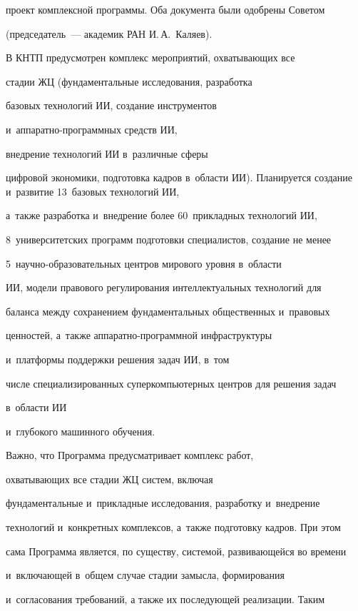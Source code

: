 проект комплексной программы. Оба документа были одобрены Советом 

(председатель~--- академик РАН И.\,А.~Каляев). 

    

     В КНТП предусмотрен комплекс мероприятий, охватывающих все 

стадии ЖЦ (фундаментальные исследования, разработка 

базовых технологий ИИ, создание инструментов 

и~ап\-па\-рат\-но-про\-грам\-мных средств ИИ, 

внед\-ре\-ние технологий ИИ в~различные сферы 

циф\-ро\-вой экономики, подготовка кадров в~об\-ласти ИИ). Планируется создание и~развитие 13~базовых технологий ИИ, 

а~также разработка и~внедрение более 60~прикладных технологий ИИ, 

8~университетских программ подготовки специалистов, создание не менее 

5~на\-уч\-но-об\-ра\-зо\-ва\-тель\-ных центров мирового уровня в~области 

ИИ, модели правового регулирования интеллектуальных технологий для 

баланса между сохранением фундаментальных общественных и~правовых 

ценностей, а~также ап\-па\-рат\-но-про\-грам\-мной инфраструктуры 

и~платформы поддержки решения задач ИИ, в~том 

числе специализированных суперкомпьютерных центров для решения задач 

в~об\-ласти ИИ %

и~глубокого машинного обучения.

    

     Важно, что Программа предусматривает комплекс работ, 

охватывающих все стадии ЖЦ сис\-тем, включая 

фундаментальные и~прикладные исследования, разработку и~внедрение 

технологий и~конкретных комплексов, а~также подготовку кадров. При этом 

сама Программа является, по существу, системой, развивающейся во времени 

и~включающей в~общем случае стадии замысла, формирования 

и~согласования требований, а также их последующей реализации. Таким 

